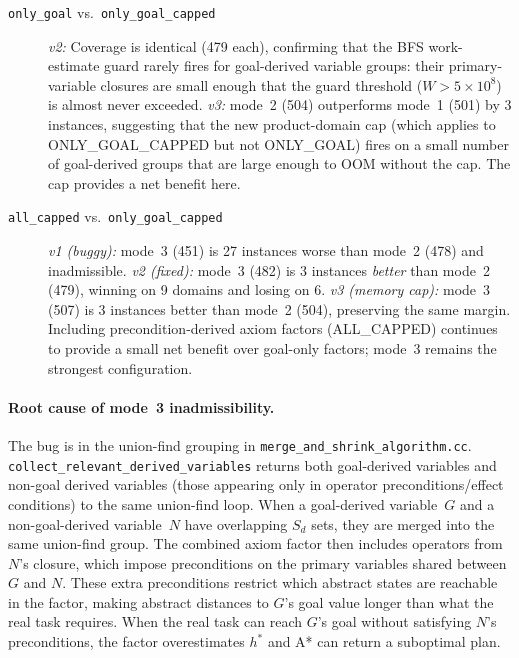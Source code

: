 \documentclass[11pt,a4paper]{article}
\begin{document}
\begin{description}
  \item[\texttt{only\_goal} vs.\ \texttt{only\_goal\_capped}]
    \emph{v2:} Coverage is identical (479 each), confirming that the BFS
    work-estimate guard rarely fires for goal-derived variable groups: their
    primary-variable closures are small enough that the guard threshold
    ($W > 5 \times 10^8$) is almost never exceeded.
    \emph{v3:} mode~2 (504) outperforms mode~1 (501) by 3 instances, suggesting
    that the new product-domain cap (which applies to ONLY\_GOAL\_CAPPED but
    not ONLY\_GOAL) fires on a small number of goal-derived groups that are
    large enough to OOM without the cap.  The cap provides a net benefit here.

  \item[\texttt{all\_capped} vs.\ \texttt{only\_goal\_capped}]
    \emph{v1 (buggy):} mode~3 (451) is 27 instances worse than mode~2 (478)
    and inadmissible.
    \emph{v2 (fixed):} mode~3 (482) is 3 instances \emph{better} than
    mode~2 (479), winning on 9 domains and losing on 6.
    \emph{v3 (memory cap):} mode~3 (507) is 3 instances better than mode~2
    (504), preserving the same margin.  Including precondition-derived axiom
    factors (ALL\_CAPPED) continues to provide a small net benefit over
    goal-only factors; mode~3 remains the strongest configuration.

\end{description}

\paragraph{Root cause of mode~3 inadmissibility.}

The bug is in the union-find grouping in \texttt{merge\_and\_shrink\_algorithm.cc}.
\texttt{collect\_relevant\_derived\_variables} returns both goal-derived variables
and non-goal derived variables (those appearing only in operator
preconditions/effect conditions) to the same union-find loop.  When a
goal-derived variable~$G$ and a non-goal-derived variable~$N$ have overlapping
$S_d$ sets, they are merged into the same union-find group.  The combined axiom
factor then includes operators from $N$'s closure, which impose preconditions on
the primary variables shared between $G$ and $N$.  These extra preconditions
restrict which abstract states are reachable in the factor, making abstract
distances to $G$'s goal value longer than what the real task requires.  When
the real task can reach $G$'s goal without satisfying $N$'s preconditions, the
factor overestimates $h^*$ and A* can return a suboptimal plan.
\end{document}
